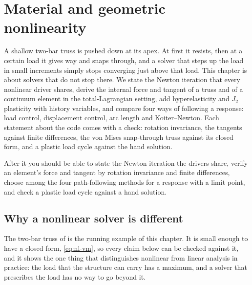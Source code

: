 \chapter{Material and geometric nonlinearity}\label{ch:nonlin}

\begin{tcolorbox}[colback=gray!5,colframe=gray!50,title={In this chapter}]
A shallow two-bar truss is pushed down at its apex. At first it resists, then at a certain load it gives way and snaps through, and a solver that steps up the load in small increments simply stops converging just above that load. This chapter is about solvers that do not stop there. We state the Newton iteration that every nonlinear driver shares, derive the internal force and tangent of a truss and of a continuum element in the total-Lagrangian setting, add hyperelasticity and $J_2$ plasticity with history variables, and compare four ways of following a response: load control, displacement control, arc length and Koiter--Newton. Each statement about the code comes with a check: rotation invariance, the tangents against finite differences, the von Mises snap-through truss against its closed form, and a plastic load cycle against the hand solution.\par\smallskip
After it you should be able to state the Newton iteration the drivers share, verify an element's force and tangent by rotation invariance and finite differences, choose among the four path-following methods for a response with a limit point, and check a plastic load cycle against a hand solution.
\end{tcolorbox}

\section{Why a nonlinear solver is different}\label{sec:nl-why}

The two-bar truss of  is the running example of this chapter. It is small enough to have a closed form, \eqref{eq:nl-vm}, so every claim below can be checked against it, and it shows the one thing that distinguishes nonlinear from linear analysis in practice: the load that the structure can carry has a maximum, and a solver that prescribes the load has no way to go beyond it.

